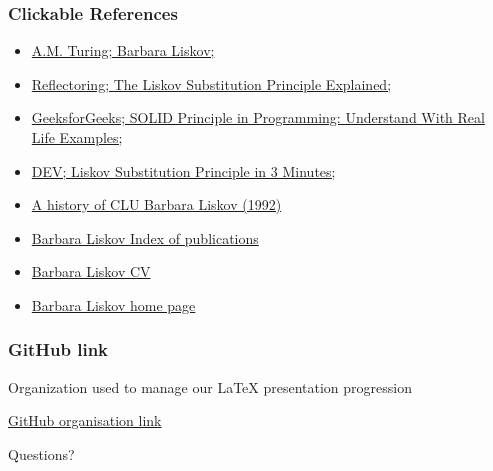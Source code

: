 \documentclass{beamer}
\begin{document}
\begin{frame}
\frametitle{Clickable References}
\begin{itemize}
\item \href{https://amturing.acm.org/award_winners/liskov_1108679.cfm}{ A.M. Turing; Barbara Liskov;} 

\item \href{https://reflectoring.io/lsp-explained/}{ Reflectoring; The Liskov Substitution Principle Explained;}

\item \href{https://www.geeksforgeeks.org/solid-principle-in-programming-understand-with-real-life-e}{GeeksforGeeks; SOLID Principle in Programming: Understand With Real Life Examples;}


\item \href{https://dev.to/erikwhiting88/liskov-substitution-principle-in-3-minutes-2}{DEV; Liskov Substitution Principle in 3 Minutes;}
\item \href {https://dl.acm.org/doi/abs/10.1145/155360.155367}{A history of CLU Barbara Liskov (1992)}
\item \href{https://dblp.uni-trier.de/pid/l/BarbaraLiskov.html}{Barbara Liskov Index of publications}

\item \href{http://www.pmg.csail.mit.edu/~liskov/newcv-09.pdf}{Barbara Liskov CV}

\item \href{http://www.pmg.csail.mit.edu/~liskov/}{Barbara Liskov home page}

\end{itemize}
\end{frame}


\begin{frame}
\frametitle{GitHub link}

Organization used to manage our LaTeX presentation progression

\vspace{5mm}


\href{https://github.com/Research-Methods-Presentation}{GitHub organisation link} 

\end{frame}


\begin{frame}
\Huge{\centerline{Questions?}}
\end{frame}

\end{document}
